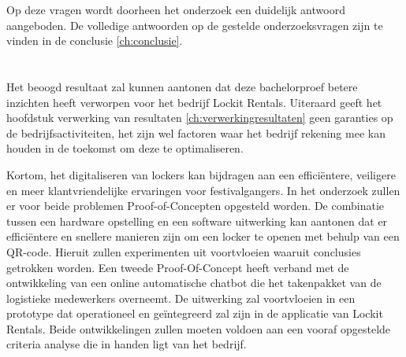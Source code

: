 
Op deze vragen wordt doorheen het onderzoek een duidelijk antwoord aangeboden. De volledige antwoorden op de gestelde onderzoeksvragen zijn te vinden in de conclusie \ref{ch:conclusie}.


\section{}%
\label{sec:onderzoeksdoelstelling}
Het beoogd resultaat zal kunnen aantonen dat deze bachelorproef betere inzichten heeft verworpen voor het bedrijf Lockit Rentals. Uiteraard geeft het hoofdstuk verwerking van resultaten \ref{ch:verwerkingresultaten} geen garanties op de bedrijfsactiviteiten, het zijn wel factoren waar het bedrijf rekening mee kan houden in de toekomst om deze te optimaliseren.

Kortom, het digitaliseren van lockers kan bijdragen aan een efficiëntere, veiligere en meer klantvriendelijke ervaringen voor festivalgangers. In het onderzoek zullen er voor beide problemen Proof-of-Concepten opgesteld worden. De combinatie tussen een hardware opstelling en een software uitwerking kan aantonen dat er efficiëntere en snellere manieren zijn om een locker te openen met behulp van een QR-code. Hieruit zullen experimenten uit voortvloeien waaruit conclusies getrokken worden. Een tweede Proof-Of-Concept heeft verband met de ontwikkeling van een online automatische chatbot die het takenpakket van de logistieke medewerkers overneemt. De uitwerking zal voortvloeien in een prototype dat operationeel en geïntegreerd zal zijn in de applicatie van Lockit Rentals. Beide ontwikkelingen zullen moeten voldoen aan een vooraf opgestelde criteria analyse die in handen ligt van het bedrijf. 
\newpage


\section{}%
\label{sec:opzet-bachelorproef}

